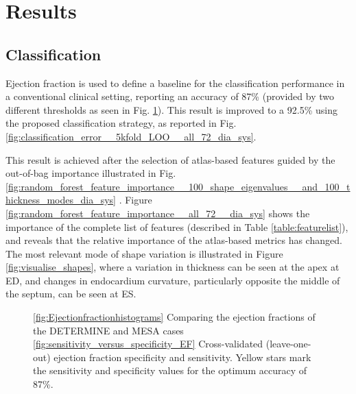 \documentclass{llncs}
\begin{document}
\section{Results}
	\subsection{Classification}
Ejection fraction is used to define a baseline for the classification performance in a conventional clinical setting, reporting an accuracy of 87\% (provided by two different thresholds as seen in Fig. \ref{fig:EFs}). This result is improved to a 92.5\% using the proposed classification strategy, as reported in Fig.    \ref{fig:classification_error__5kfold_LOO__all_72_dia_sys}. 

This result is achieved after the selection of atlas-based features guided by the out-of-bag importance illustrated in Fig. \ref{fig:random_forest_feature_importance__100_shape_eigenvalues__and_100_thickness_modes_dia_sys} . Figure \ref{fig:random_forest_feature_importance__all_72__dia_sys} shows the importance of the complete list of features (described in Table \ref{table:featurelist}), and reveals that the relative importance of the atlas-based metrics has changed. The most relevant mode of shape variation is illustrated in Figure \ref{fig:visualise_shapes}, where a variation in thickness can be seen at the apex at ED, and changes in endocardium curvature, particularly opposite the middle of the septum, can be seen at ES. 

		
		\begin{figure}[]
		\qquad
\begin{center} 

\!

\caption{ \ref{fig:Ejectionfractionhistograms} Comparing the ejection fractions of the DETERMINE and MESA cases \ref{fig:sensitivity_versus_specificity_EF} Cross-validated (leave-one-out) ejection fraction specificity and sensitivity. Yellow stars mark the sensitivity and specificity values for the optimum accuracy of 87\%.}
\label{fig:EFs}
\end{center}    

		\end{figure}
\end{document}
